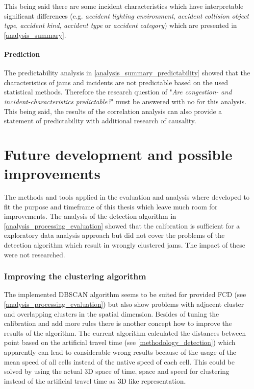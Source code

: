This being said there are some incident characteristics which have interpretable significant differences (e.g. \textit{accident lighting environment}, \textit{accident collision object type}, \textit{accident kind}, \textit{accident type} or \textit{accident category}) which are presented in \cref{analysis_summary}.

\paragraph{Prediction} The predictability analysis in \cref{analysis_summary_predictability} showed that the characteristics of jams and incidents are not predictable based on the used statistical methods. Therefore the research question of "\textit{Are congestion- and incident-characteristics predictable?}" must be answered with no for this analysis. This being said, the results of the correlation analysis can also provide a statement of predictability with additional research of causality.

\section{Future development and possible improvements} 
The methods and tools applied in the evaluation and analysis where developed to fit the purpose and timeframe of this thesis which leave much room for improvements. The analysis of the detection algorithm in \cref{analysis_processing_evaluation} showed that the calibration is sufficient for a exploratory data analysis approach but did not cover the problems of the detection algorithm which result in wrongly clustered jams. The impact of these were not researched.

\subsubsection{Improving the clustering algorithm}
The implemented DBSCAN algorithm seems to be suited for provided FCD (see \cref{analysis_processing_evaluation}) but also show problems with adjacent cluster and overlapping clusters in the spatial dimension. Besides of tuning the calibration and add more rules there is another concept how to improve the results of the algorithm. The current algorithm calculated the distances between point based on the artificial travel time (see \cref{methodology_detection}) which apparently can lead to considerable wrong results because of the usage of the mean speed of all cells instead of the native speed of each cell. This could be solved by using the actual 3D space of time, space and speed for clustering instead of the artificial travel time as 3D like representation.

